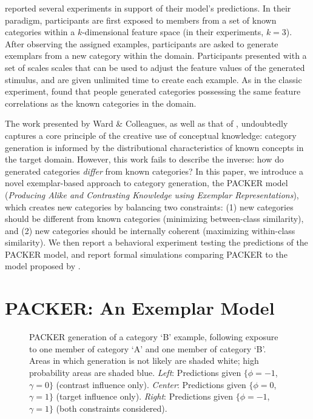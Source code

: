 \documentclass[10pt,letterpaper]{article}
\newcommand\inputpgf[2]{{
\let\pgfimageWithoutPath\pgfimage
\renewcommand{\pgfimage}[2][]{\pgfimageWithoutPath[##1]{#1/##2}}

}}
\begin{document}
\citet{jern2013probabilistic} reported several experiments in support of their model's predictions. In their paradigm, participants are first exposed to members from a set of known categories within a $k$-dimensional feature space (in their experiments, $k=3$). After observing the assigned examples, participants are asked to generate exemplars from a new category within the domain. Participants presented with a set of scales scales that can be used to adjust the feature values of the generated stimulus, and are given unlimited time to create each example. As in the classic \cite{ward1994structured} experiment, \citet{jern2013probabilistic} found that people generated categories possessing the same feature correlations as the known categories in the domain.

The work presented by Ward \& Colleagues, as well as that of \citet{jern2013probabilistic}, undoubtedly captures a core principle of the creative use of conceptual knowledge: category generation is informed by the distributional characteristics of known concepts in the target domain. However, this work fails to describe the inverse: how do generated categories \textit{differ} from known categories? In this paper, we introduce a novel exemplar-based approach to category generation, the PACKER model (\textit{Producing Alike and Contrasting Knowledge using Exemplar Representations}), which creates new categories by balancing two constraints: (1) new categories should be different from known categories (minimizing between-class similarity), and (2) new categories should be internally coherent (maximizing within-class similarity). We then report a behavioral experiment testing the predictions of the PACKER model, and report formal simulations comparing PACKER to the model proposed by \cite{jern2013probabilistic}.

\section{PACKER: An Exemplar Model}

\begin{figure*}
    \begin{center}
    \inputpgf{figs/}{example-prob-spaces.pgf}
    \caption{PACKER generation of a category `B' example, following exposure to one member of category `A' and one member of category `B'. Areas in which generation is not likely are shaded white; high probability areas are shaded blue. \textit{Left}: Predictions given $\{\phi = -1$, $\gamma = 0\}$ (contrast influence only). \textit{Center}: Predictions given $\{\phi = 0$, $\gamma = 1\}$ (target influence only).  \textit{Right}: Predictions given $\{\phi = -1$, $\gamma = 1\}$ (both constraints considered).  }
    \label{fig:example-prob-spaces}
    \end{center}
\end{figure*}
\end{document}
